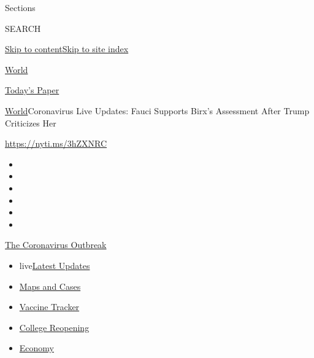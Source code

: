Sections

SEARCH

\protect\hyperlink{site-content}{Skip to
content}\protect\hyperlink{site-index}{Skip to site index}

\href{https://www.nytimes.com/section/world}{World}

\href{https://myaccount.nytimes.com/auth/login?response_type=cookie\&client_id=vi}{}

\href{https://www.nytimes.com/section/todayspaper}{Today's Paper}

\href{/section/world}{World}\textbar{}Coronavirus Live Updates: Fauci
Supports Birx's Assessment After Trump Criticizes Her

\url{https://nyti.ms/3hZXNRC}

\begin{itemize}
\item
\item
\item
\item
\item
\item
\end{itemize}

\href{https://www.nytimes.com/news-event/coronavirus?action=click\&pgtype=Article\&state=default\&region=TOP_BANNER\&context=storylines_menu}{The
Coronavirus Outbreak}

\begin{itemize}
\tightlist
\item
  live\href{https://www.nytimes.com/2020/08/03/world/coronavirus-covid-19.html?action=click\&pgtype=Article\&state=default\&region=TOP_BANNER\&context=storylines_menu}{Latest
  Updates}
\item
  \href{https://www.nytimes.com/interactive/2020/us/coronavirus-us-cases.html?action=click\&pgtype=Article\&state=default\&region=TOP_BANNER\&context=storylines_menu}{Maps
  and Cases}
\item
  \href{https://www.nytimes.com/interactive/2020/science/coronavirus-vaccine-tracker.html?action=click\&pgtype=Article\&state=default\&region=TOP_BANNER\&context=storylines_menu}{Vaccine
  Tracker}
\item
  \href{https://www.nytimes.com/2020/08/02/us/covid-college-reopening.html?action=click\&pgtype=Article\&state=default\&region=TOP_BANNER\&context=storylines_menu}{College
  Reopening}
\item
  \href{https://www.nytimes.com/live/2020/08/03/business/stock-market-today-coronavirus?action=click\&pgtype=Article\&state=default\&region=TOP_BANNER\&context=storylines_menu}{Economy}
\end{itemize}

